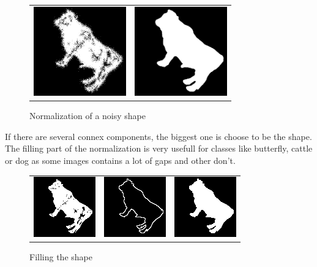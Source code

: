 \documentclass[a4paper, 11pt]{article}
\begin{document}
\begin{figure}[h!]
\centering
\begin{tabular}{ll}
\includegraphics[width=4cm]{normalize-noisy-1.png} &
\includegraphics[width=4cm]{normalize-noisy-2.png} \\
\end{tabular}
\caption{Normalization of a noisy shape}
\end{figure}
 
\noindent If there are several connex components, the biggest one is choose to be the shape. The filling part of the normalization is very usefull for classes like butterfly, cattle or dog as some images contains a lot of gaps and other don't.

\begin{figure}[h!]
\centering
\begin{tabular}{ccc}
\includegraphics{normalize-1.png} &
\includegraphics{normalize-2.png} &
\includegraphics{normalize-3.png} \\
\end{tabular}
\caption{Filling the shape}
\end{figure}
\end{document}
